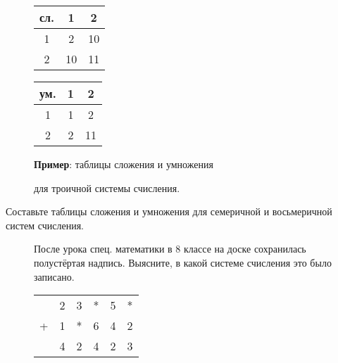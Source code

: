 \begin{figure}
    \begin{minipage}{0.2\linewidth}
        \begin{tabular}{ |c|c|c| } 
         \hline
         сл. & 1 & 2 \\ 
         \hline
         1 & 2 & 10 \\ 
         \hline
         2 & 10 & 11 \\ 
         \hline
        \end{tabular}
    \end{minipage}
    \hfill
    \begin{minipage}{0.2\linewidth}
        \begin{tabular}{ |c|c|c| } 
         \hline
         ум. & 1 & 2 \\ 
         \hline
         1 & 1 & 2 \\ 
         \hline
         2 & 2 & 11 \\ 
         \hline
        \end{tabular}
    \end{minipage}
    \hfill
    \begin{minipage}{0.5\linewidth}     
        \textbf{Пример}: таблицы сложения и умножения
        \par для троичной системы счисления.
    \end{minipage}
\end{figure}

\begin{thm}
    Составьте таблицы сложения и умножения для семеричной и восьмеричной систем счисления.
\end{thm}


\begin{figure}
    \begin{minipage}{0.7\linewidth}       
        \begin{thm}
            После урока спец. математики в 8 классе на доске сохранилась 
            полустёртая надпись. Выясните, в какой системе счисления это было записано.
        \end{thm}
    \end{minipage}
    \hfill
    \begin{minipage}{0.21\linewidth}
        \begin{tabular}{ rrrrrr } 
          &2 & 3 & * & 5 & * \\
         + & 1 & * & 6 & 4 & 2 \\
         \hline
          & 4 & 2 & 4 & 2 & 3
         \end{tabular}
    \end{minipage}
\end{figure}


